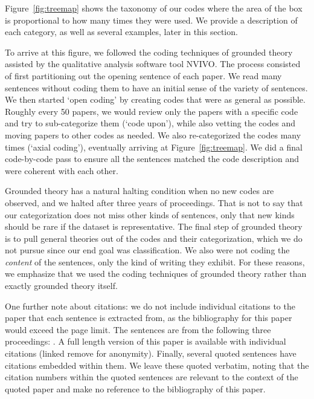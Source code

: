 \documentclass[sigconf,anonymous]{acmart}
\begin{document}
	
	
	Figure~\ref{fig:treemap} shows the taxonomy of our codes where the area of the box is proportional to how many times they were used. We provide a description of each category, as well as several examples, later in this section.
	
	To arrive at this figure, we followed the coding techniques of grounded theory assisted by the qualitative analysis software tool NVIVO. The process consisted of first partitioning out the opening sentence of each paper. We read many sentences without coding them to have an initial sense of the variety of sentences. We then started `open coding' by creating codes that were as general as possible. Roughly every 50 papers, we would review only the papers with a specific code and try to sub-categorize them (`code upon'), while also vetting the codes and moving papers to other codes as needed. We also re-categorized the codes many times (`axial coding'), eventually arriving at Figure~\ref{fig:treemap}. We did a final code-by-code pass to ensure all the sentences matched the code description and were coherent with each other. 
	
	Grounded theory has a natural halting condition when no new codes are observed, and we halted after three years of proceedings. That is not to say that our categorization does not miss other kinds of sentences, only that new kinds should be rare if the dataset is representative. The final step of grounded theory is to pull general theories out of the codes and their categorization, which we do not pursue since our end goal was classification. We also were not coding the \textit{content} of the sentences, only the kind of writing they exhibit. For these reasons, we emphasize that we used the coding techniques of grounded theory rather than exactly grounded theory itself. 
	
	One further note about citations: we do not include individual citations to the paper that each sentence is extracted from, as the bibliography for this paper would exceed the page limit. The sentences are from the following three proceedings: \cite{usenix14,usenix15,usenix16}. A full length version of this paper is available with individual citations (linked remove for anonymity). Finally, several quoted sentences have citations embedded within them. We leave these quoted verbatim, noting that the citation numbers within the quoted sentences are relevant to the context of the quoted paper and make no reference to the bibliography of this paper. 
	
\end{document}
